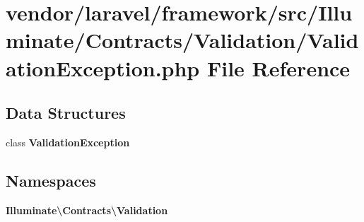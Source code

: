 \section{vendor/laravel/framework/src/\+Illuminate/\+Contracts/\+Validation/\+Validation\+Exception.php File Reference}
\label{_validation_exception_8php}
\subsection*{Data Structures}
\begin{DoxyCompactItemize}
\item 
class {\bf Validation\+Exception}
\end{DoxyCompactItemize}
\subsection*{Namespaces}
\begin{DoxyCompactItemize}
\item 
 {\bf Illuminate\textbackslash{}\+Contracts\textbackslash{}\+Validation}
\end{DoxyCompactItemize}
